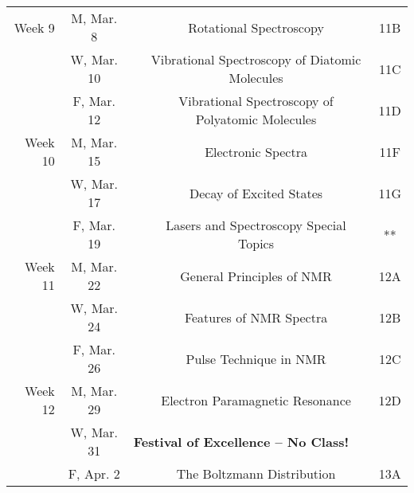 \documentclass[12pt, letterpaper]{article}
\begin{document}
\begin{tabular}{rcccc}
	\midrule
	Week 9  & M, Mar. 8  &                                                                  & Rotational Spectroscopy                                    & 11B     \\
	        & W, Mar. 10 &                                                                  & Vibrational Spectroscopy of Diatomic Molecules             & 11C     \\
	        & F, Mar. 12 &                                                                  & Vibrational Spectroscopy of Polyatomic Molecules           & 11D     \\
	\midrule
	Week 10 & M, Mar. 15 &                                                                  & Electronic Spectra                                         & 11F     \\
	        & W, Mar. 17 &                                                                  & Decay of Excited States                                    & 11G     \\
	        & F, Mar. 19 &                                                                  & Lasers and Spectroscopy Special Topics                     & **      \\
	\midrule
	Week 11 & M, Mar. 22 &                                                                  & General Principles of NMR                                  & 12A     \\
	        & W, Mar. 24 &                                                                  & Features of NMR Spectra                                    & 12B     \\
	        & F, Mar. 26 &                                                                  & Pulse Technique in NMR                                     & 12C     \\
	\midrule
	Week 12 & M, Mar. 29 &                                                                  & Electron Paramagnetic Resonance                            & 12D     \\
	        & W, Mar. 31 & \multicolumn{3}{l}{\textbf{Festival of Excellence -- No Class!}}                                                                        \\
	        & F, Apr. 2  &                                                                  & The Boltzmann Distribution                                 & 13A     \\
\end{tabular}
\end{document}
